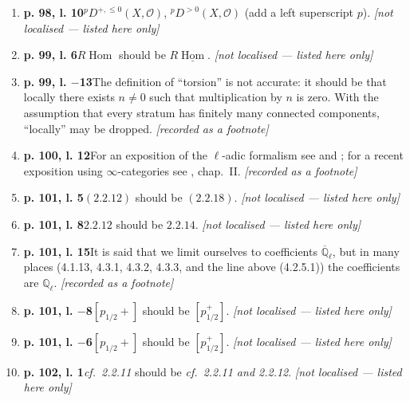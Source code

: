 \documentclass[12pt,oneside]{amsbook}
\theoremstyle{plain}
\theoremstyle{definition}
\newcommand{\OO}{\mathcal{O}}
\newcommand{\Ql}{\mathbb{Q}_{\ell}}
\newcommand{\Qlb}{\overline{\mathbb{Q}}_{\ell}}
\DeclareMathOperator{\Hom}{Hom}
\begin{document}
\begin{enumerate}[label={\arabic*.},leftmargin=2.6em,itemsep=4pt]
\item \textbf{p. 98, l. 10}\quad ${}^{p}D^{+,\leq0}(X,\OO)$, ${}^{p}D^{>0}(X,\OO)$ (add a left superscript $p$). \hfill\newline \textsl{[not localised --- listed here only]}
\item \textbf{p. 99, l. 6}\quad $R\Hom$ should be $R\underline{\Hom}$. \hfill\newline \textsl{[not localised --- listed here only]}
\item \textbf{p. 99, l. $-$13}\quad The definition of ``torsion'' is not accurate: it should be that locally there exists $n\neq0$ such that multiplication by $n$ is zero. With the assumption that every stratum has finitely many connected components, ``locally'' may be dropped. \hfill\newline \textsl{[recorded as a footnote]}
\item \textbf{p. 100, l. 12}\quad For an exposition of the $\ell$-adic formalism see \cite{Eke90} and \cite{BS15}; for a recent exposition using $\infty$-categories see \cite{GL17}, chap.~II. \hfill\newline \textsl{[recorded as a footnote]}
\item \textbf{p. 101, l. 5}\quad $(2.2.12)$ should be $(2.2.18)$. \hfill\newline \textsl{[not localised --- listed here only]}
\item \textbf{p. 101, l. 8}\quad $2.2.12$ should be $2.2.14$. \hfill\newline \textsl{[not localised --- listed here only]}
\item \textbf{p. 101, l. 15}\quad It is said that we limit ourselves to coefficients $\Qlb$, but in many places (4.1.13, 4.3.1, 4.3.2, 4.3.3, and the line above (4.2.5.1)) the coefficients are $\Ql$. \hfill\newline \textsl{[recorded as a footnote]}
\item \textbf{p. 101, l. $-$8}\quad $[p_{1/2}+]$ should be $[p^{+}_{1/2}]$. \hfill\newline \textsl{[not localised --- listed here only]}
\item \textbf{p. 101, l. $-$6}\quad $[p_{1/2}+]$ should be $[p^{+}_{1/2}]$. \hfill\newline \textsl{[not localised --- listed here only]}
\item \textbf{p. 102, l. 1}\quad \emph{cf.\ 2.2.11} should be \emph{cf.\ 2.2.11 and 2.2.12}. \hfill\newline \textsl{[not localised --- listed here only]}

\end{enumerate}
\end{document}
